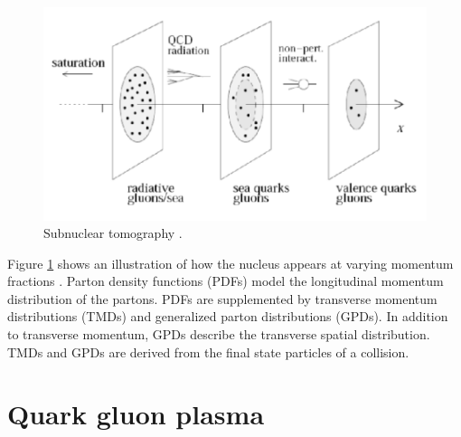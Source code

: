 \begin{figure}[h!]
\begin{centering}
\includegraphics[width=5in]{Chapter1/importfigs/imaging_the_nucleon_upc_dijets_pres.png}
\par\end{centering}
\caption{Subnuclear tomography \cite{Accardi:2011mz}. \label{fig:nuclImag}}
\end{figure}

Figure \ref{fig:nuclImag} shows an illustration of how the nucleus appears at varying momentum fractions \cite{Accardi:2011mz}. Parton density functions (PDFs) model the longitudinal momentum distribution of the partons. PDFs are supplemented by transverse momentum distributions (TMDs) and generalized parton distributions (GPDs). In addition to transverse momentum, GPDs describe the transverse spatial distribution. TMDs and GPDs are derived from the final state particles of a collision.

\section{Quark gluon plasma}

